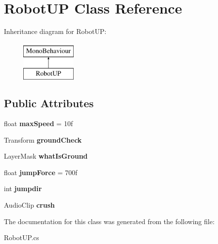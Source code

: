 \hypertarget{class_robot_u_p}{}\section{Robot\+U\+P Class Reference}
\label{class_robot_u_p}
Inheritance diagram for Robot\+U\+P\+:\begin{figure}[H]
\begin{center}
\leavevmode
\includegraphics[height=2.000000cm]{class_robot_u_p}
\end{center}
\end{figure}
\subsection*{Public Attributes}
\begin{DoxyCompactItemize}
\item 
\hypertarget{class_robot_u_p_adaa4938db69717a593c24fb080c9a0b2}{}float {\bfseries max\+Speed} = 10f\label{class_robot_u_p_adaa4938db69717a593c24fb080c9a0b2}

\item 
\hypertarget{class_robot_u_p_a788f69026ec7cb861c976f48ed173e3f}{}Transform {\bfseries ground\+Check}\label{class_robot_u_p_a788f69026ec7cb861c976f48ed173e3f}

\item 
\hypertarget{class_robot_u_p_af65f8e27eb07754fb31db01e2ae70ff2}{}Layer\+Mask {\bfseries what\+Is\+Ground}\label{class_robot_u_p_af65f8e27eb07754fb31db01e2ae70ff2}

\item 
\hypertarget{class_robot_u_p_a76a553f3d94cc791cd1f9564c4e305a1}{}float {\bfseries jump\+Force} = 700f\label{class_robot_u_p_a76a553f3d94cc791cd1f9564c4e305a1}

\item 
\hypertarget{class_robot_u_p_afd687df4e7449818d7ecaa6a02930193}{}int {\bfseries jumpdir}\label{class_robot_u_p_afd687df4e7449818d7ecaa6a02930193}

\item 
\hypertarget{class_robot_u_p_ada3f9b6c3dfd5eca37f091eb82c1bea6}{}Audio\+Clip {\bfseries crush}\label{class_robot_u_p_ada3f9b6c3dfd5eca37f091eb82c1bea6}

\end{DoxyCompactItemize}


The documentation for this class was generated from the following file\+:\begin{DoxyCompactItemize}
\item 
Robot\+U\+P.\+cs\end{DoxyCompactItemize}
